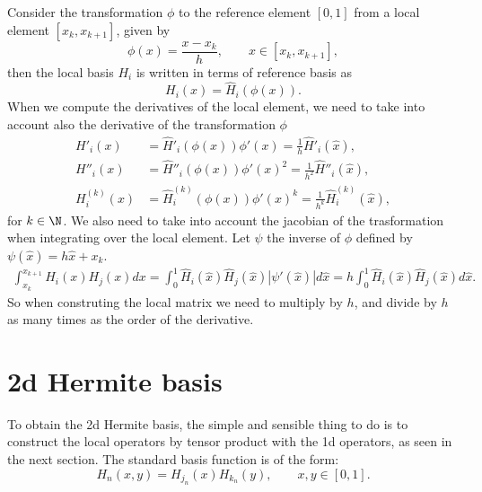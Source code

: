 \documentclass[]{report}
\begin{document}
    Consider the transformation $\phi$ to the reference element $[0,1]$ from a local element $[x_k, x_{k+1}]$, given by
    \begin{equation*}
        \phi(x) = \frac{x-x_k}{h}, \qquad x \in [x_k,x_{k+1}],
    \end{equation*}
    then the local basis $H_i$ is written in terms of reference basis as
    \begin{equation*}
        H_i(x) = \hat{H}_i(\phi(x)).
    \end{equation*}
    When we compute the derivatives of the local element, we need to take into account also the derivative of the transformation $\phi$
    \begin{align*}
        H'_i(x) &= \hat{H}'_i(\phi(x)) \phi'(x) = \frac{1}{h} \hat{H}'_i(\hat{x}), \\
        H''_i(x) &= \hat{H}''_i(\phi(x)) \phi'(x)^2 = \frac{1}{h^2} \hat{H}''_i(\hat{x}), \\
        H^{(k)}_i(x) &= \hat{H}^{(k)}_i(\phi(x)) \phi'(x)^k = \frac{1}{h^k}\hat{H}^{(k)}_i(\hat{x}),
    \end{align*}
    for $k \in \N$. We also need to take into account the jacobian of the trasformation when integrating over the local element. Let $\psi$ the inverse of $\phi$ defined by $\psi(\hat{x}) = h \hat{x} + x_k$. 
    \begin{align*}
        \int_{x_k}^{x_{k+1}} H_i(x)H_j(x)dx = \int_0^1 \hat{H}_i(\hat{x}) \hat{H}_j(\hat{x}) |\psi'(\hat{x})| d\hat{x} = h \int_0^1 \hat{H}_i(\hat{x}) \hat{H}_j(\hat{x}) d\hat{x}.
    \end{align*}
    {\color{red} So when construting the local matrix we need to multiply by $h$, and divide by $h$ as many times as the order of the derivative.}

    \section*{2d Hermite basis}
    To obtain the 2d Hermite basis, the simple and sensible thing to do is to construct the local operators by tensor product with the 1d operators, as seen in the next section. 
    The standard basis function is of the form:
    \begin{equation}
        H_n(x,y) = H_{j_n}(x) H_{k_n}(y), \qquad x, y \in [0,1].
    \end{equation}
\end{document}
